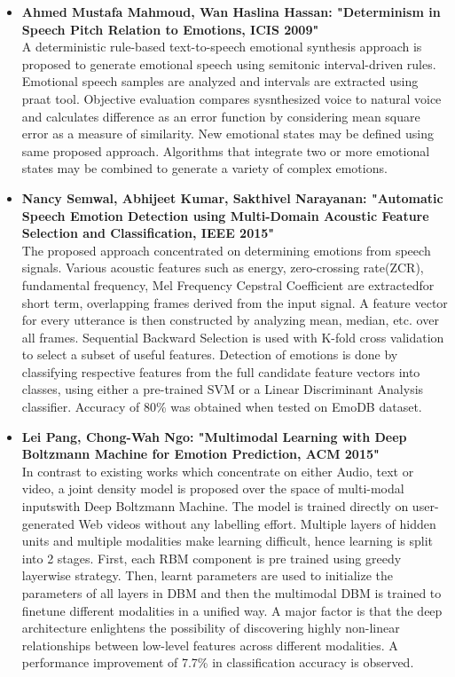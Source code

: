 \documentclass[oneside,a4paper,12pt]{report}
\begin{document}
\begin{normalsize}
\begin{itemize}
		\vspace{5mm}
	\item \textbf{Ahmed Mustafa Mahmoud,  Wan Haslina Hassan:  "Determinism in Speech Pitch Relation to Emotions, ICIS 2009"} \cite{mahmoud09_deter} \\
	A deterministic rule-based text-to-speech emotional synthesis approach is proposed to generate emotional speech using semitonic interval-driven rules. Emotional speech samples are analyzed and intervals are extracted using praat tool. Objective evaluation compares sysnthesized voice to natural voice and calculates difference as an error function by considering mean square error as a measure of similarity. New emotional states may be defined using same proposed approach. Algorithms that integrate two or more emotional states may be combined to generate a variety of complex emotions.
		\vspace{5mm}
	\item \textbf{Nancy Semwal,  Abhijeet Kumar, Sakthivel Narayanan:  "Automatic Speech Emotion Detection using Multi-Domain Acoustic Feature Selection and Classification,  IEEE 2015"} \cite{semwal17_autom} \\
	The proposed approach concentrated on determining emotions from speech signals. Various acoustic features such as energy, zero-crossing rate(ZCR), fundamental frequency, Mel Frequency Cepstral Coefficient are extractedfor short term, overlapping frames derived from the input signal. A feature vector for every utterance is then constructed by analyzing mean, median, etc. over all frames. Sequential Backward Selection is used with K-fold cross validation to select a subset of useful features. Detection of emotions is done by classifying respective features from the full candidate feature vectors into classes, using either a pre-trained SVM or a Linear Discriminant Analysis classifier. Accuracy of 80\% was obtained when tested on EmoDB dataset.
		\vspace{5mm}
	\item \textbf{Lei Pang,  Chong-Wah Ngo:  "Multimodal Learning with Deep Boltzmann Machine for Emotion Prediction,  ACM 2015"} \cite{pang15_mutlim_learn_deep_boltz_machin} \\
	In contrast to existing works which concentrate on either Audio, text or video, a joint density model is proposed over the space of multi-modal inputswith Deep Boltzmann Machine. The model is trained directly on user-generated Web videos without any labelling effort. Multiple layers of hidden units and multiple modalities make learning difficult, hence learning is split into 2 stages. First, each RBM component is pre trained using greedy layerwise strategy. Then, learnt parameters are used to initialize the parameters of all layers in DBM and then the multimodal DBM is trained to finetune different modalities in a unified way. A major factor is that the deep architecture enlightens the possibility of discovering highly non-linear relationships between low-level features across different modalities. A performance improvement of 7.7\% in classification accuracy is observed.
	

\end{itemize}
\end{normalsize}
\end{document}
